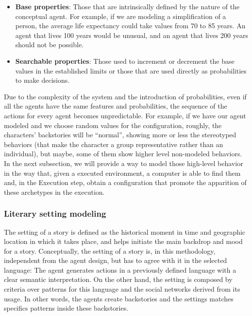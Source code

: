 \documentclass[letterpaper]{article}
\begin{document}
\begin{itemize}
\item \textbf{Base properties}: Those that are intrinsically defined by the nature of the conceptual agent. For example, if we are modeling a simplification of a person, the average life expectancy could take values from 70 to 85 years. An agent that lives 100 years would be unusual, and an agent that lives 200 years should not be possible.
\item \textbf{Searchable properties}: Those used to increment or decrement the base values in the established limits or those that are used directly as probabilities to make decisions.
\end{itemize}


Due to the complexity of the system and the introduction of probabilities, even if all the agents have the same features and probabilities, the sequence of the actions for every agent becomes unpredictable. For example, if we have our agent modeled and we choose random values for the configuration, roughly, the characters' backstories will be ``normal'', showing more or less the stereotyped behaviors (that make the character a group representative rather than an individual), but maybe, some of them show higher level non-modeled behaviors. In the next subsection, we will provide a way to model those high-level behavior in the way that, given a executed environment, a computer is able to find them 
and, in the Execution step, obtain a configuration that promote the apparition of these archetypes in the execution.

\subsubsection{Literary setting modeling}


The setting of a story is defined as the historical moment in time and geographic location in which it takes place, and helps initiate the main backdrop and mood for a story.
Conceptually, the setting of a story is, in this methodology, independent from the agent design, but has to agree with it in the selected language: 
The agent generates actions in a previously defined language with a clear semantic interpretation. On the other hand, the setting is composed by criteria over patterns for this language and the social networks derived from its usage. In other words, the agents create backstories and the settings matches specifics patterns inside these backstories.
\end{document}
